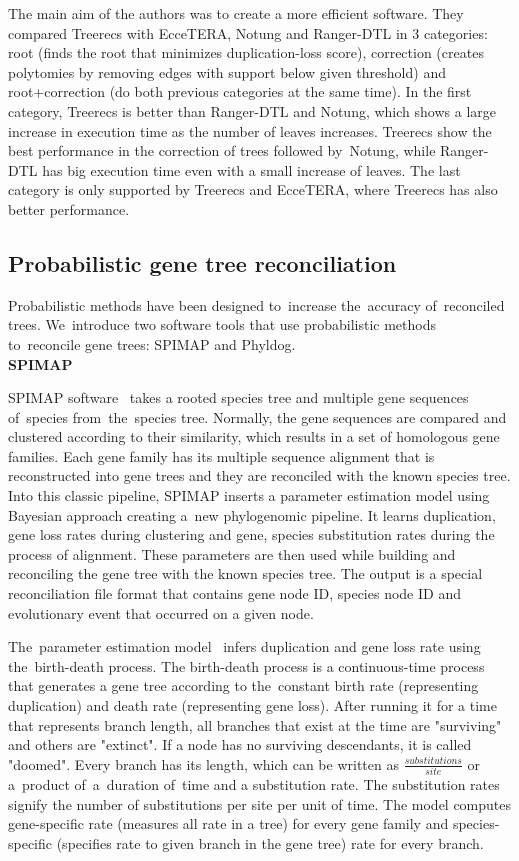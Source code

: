 The main aim of the authors was to create a more efficient software. They compared Treerecs with EcceTERA, Notung and Ranger-DTL in 3 categories: root (finds the root that minimizes duplication-loss score), correction (creates polytomies by removing edges with support below given threshold) and root+correction (do both previous categories at the same time). In the first category, Treerecs is better than Ranger-DTL and Notung, which shows a large increase in execution time as the number of leaves increases. Treerecs show the best performance in the correction of trees followed by~Notung, while Ranger-DTL has big execution time even with a small increase of leaves. The last category is only supported by Treerecs and EcceTERA, where Treerecs has also better performance.

\subsection{Probabilistic gene tree reconciliation}
Probabilistic methods have been designed to~increase the~accuracy of~reconciled trees. We~introduce two software tools that use probabilistic methods to~reconcile gene trees: SPIMAP and Phyldog.\\
\textbf{SPIMAP}

SPIMAP software~\cite{spimap_online} takes a rooted species tree and multiple gene sequences of~species from~the~species tree. Normally, the gene sequences are compared and clustered according to their similarity, which results in a set of homologous gene families. Each gene family has its multiple sequence alignment that is reconstructed into gene trees and they are reconciled with the known species tree. Into this classic pipeline, SPIMAP inserts a parameter estimation model using Bayesian approach creating a~new phylogenomic pipeline. It learns duplication, gene loss rates during clustering and gene, species substitution rates during the process of alignment. These parameters are then used while building and reconciling the gene tree with the known species tree. The output is a special reconciliation file format that contains gene node ID, species node ID and evolutionary event that occurred on a given node.

The~parameter estimation model~\cite{spimap} infers duplication and gene loss rate using the~birth-death process. The birth-death process is a continuous-time process that generates a gene tree according to the~constant birth rate (representing duplication) and death rate (representing gene loss). After running it for a time that represents branch length, all branches that exist at the time are "surviving" and others are "extinct". If a node has no surviving descendants, it is called "doomed". Every branch has its length, which can be written as  \( \frac{substitutions}{site} \) or a~product of~a~duration of~time and a substitution rate. The substitution rates signify the number of substitutions per site per unit of time. The model computes gene-specific rate (measures all rate in a tree) for every gene family and species-specific (specifies rate to given branch in the gene tree) rate for every branch.

